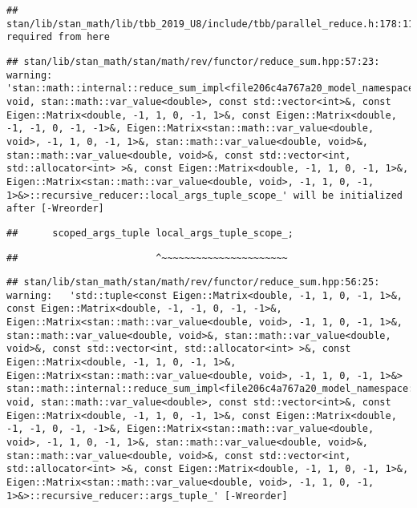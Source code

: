\documentclass[
]{article}
\begin{document}
\begin{verbatim}
## stan/lib/stan_math/lib/tbb_2019_U8/include/tbb/parallel_reduce.h:178:11:   required from here
\end{verbatim}

\begin{verbatim}
## stan/lib/stan_math/stan/math/rev/functor/reduce_sum.hpp:57:23: warning: 'stan::math::internal::reduce_sum_impl<file206c4a767a20_model_namespace::partial_log_lik_rsfunctor__, void, stan::math::var_value<double>, const std::vector<int>&, const Eigen::Matrix<double, -1, 1, 0, -1, 1>&, const Eigen::Matrix<double, -1, -1, 0, -1, -1>&, Eigen::Matrix<stan::math::var_value<double, void>, -1, 1, 0, -1, 1>&, stan::math::var_value<double, void>&, stan::math::var_value<double, void>&, const std::vector<int, std::allocator<int> >&, const Eigen::Matrix<double, -1, 1, 0, -1, 1>&, Eigen::Matrix<stan::math::var_value<double, void>, -1, 1, 0, -1, 1>&>::recursive_reducer::local_args_tuple_scope_' will be initialized after [-Wreorder]
\end{verbatim}

\begin{verbatim}
##      scoped_args_tuple local_args_tuple_scope_;
\end{verbatim}

\begin{verbatim}
##                        ^~~~~~~~~~~~~~~~~~~~~~~
\end{verbatim}

\begin{verbatim}
## stan/lib/stan_math/stan/math/rev/functor/reduce_sum.hpp:56:25: warning:   'std::tuple<const Eigen::Matrix<double, -1, 1, 0, -1, 1>&, const Eigen::Matrix<double, -1, -1, 0, -1, -1>&, Eigen::Matrix<stan::math::var_value<double, void>, -1, 1, 0, -1, 1>&, stan::math::var_value<double, void>&, stan::math::var_value<double, void>&, const std::vector<int, std::allocator<int> >&, const Eigen::Matrix<double, -1, 1, 0, -1, 1>&, Eigen::Matrix<stan::math::var_value<double, void>, -1, 1, 0, -1, 1>&> stan::math::internal::reduce_sum_impl<file206c4a767a20_model_namespace::partial_log_lik_rsfunctor__, void, stan::math::var_value<double>, const std::vector<int>&, const Eigen::Matrix<double, -1, 1, 0, -1, 1>&, const Eigen::Matrix<double, -1, -1, 0, -1, -1>&, Eigen::Matrix<stan::math::var_value<double, void>, -1, 1, 0, -1, 1>&, stan::math::var_value<double, void>&, stan::math::var_value<double, void>&, const std::vector<int, std::allocator<int> >&, const Eigen::Matrix<double, -1, 1, 0, -1, 1>&, Eigen::Matrix<stan::math::var_value<double, void>, -1, 1, 0, -1, 1>&>::recursive_reducer::args_tuple_' [-Wreorder]
\end{verbatim}
\end{document}
